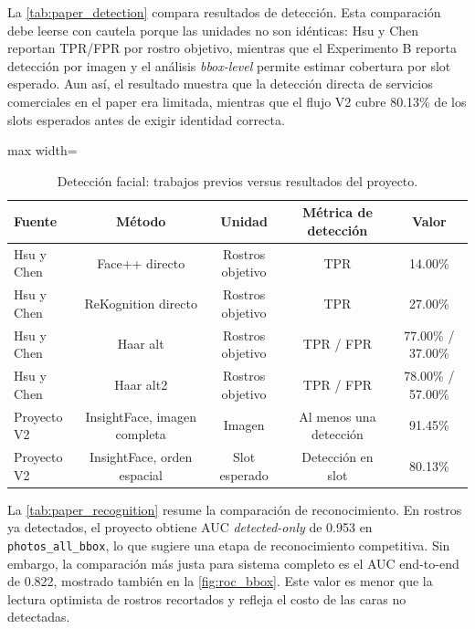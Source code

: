 \documentclass[11pt]{article}
\begin{document}
La \autoref{tab:paper_detection} compara resultados de detecci\'on. Esta comparaci\'on debe leerse con cautela porque las unidades no son id\'enticas: Hsu y Chen reportan TPR/FPR por rostro objetivo, mientras que el Experimento B reporta detecci\'on por imagen y el an\'alisis \textit{bbox-level} permite estimar cobertura por slot esperado. Aun as\'i, el resultado muestra que la detecci\'on directa de servicios comerciales en el paper era limitada, mientras que el flujo V2 cubre 80.13\% de los slots esperados antes de exigir identidad correcta.

\begin{table}[H]
\centering
\caption{Detecci\'on facial: trabajos previos versus resultados del proyecto.}
\label{tab:paper_detection}
\begin{adjustbox}{max width=\textwidth}
\begin{tabular}{lcccc}
\toprule
Fuente & M\'etodo & Unidad & M\'etrica de detecci\'on & Valor \\
\midrule
Hsu y Chen \cite{hsu2015issues} & Face++ directo & Rostros objetivo & TPR & 14.00\% \\
Hsu y Chen \cite{hsu2015issues} & ReKognition directo & Rostros objetivo & TPR & 27.00\% \\
Hsu y Chen \cite{hsu2015issues} & Haar alt & Rostros objetivo & TPR / FPR & 77.00\% / 37.00\% \\
Hsu y Chen \cite{hsu2015issues} & Haar alt2 & Rostros objetivo & TPR / FPR & 78.00\% / 57.00\% \\
Proyecto V2 & InsightFace, imagen completa & Imagen & Al menos una detecci\'on & 91.45\% \\
Proyecto V2 & InsightFace, orden espacial & Slot esperado & Detecci\'on en slot & 80.13\% \\
\bottomrule
\end{tabular}
\end{adjustbox}
\end{table}

La \autoref{tab:paper_recognition} resume la comparaci\'on de reconocimiento. En rostros ya detectados, el proyecto obtiene AUC \textit{detected-only} de 0.953 en \texttt{photos\_all\_bbox}, lo que sugiere una etapa de reconocimiento competitiva. Sin embargo, la comparaci\'on m\'as justa para sistema completo es el AUC end-to-end de 0.822, mostrado tambi\'en en la \autoref{fig:roc_bbox}. Este valor es menor que la lectura optimista de rostros recortados y refleja el costo de las caras no detectadas.
\end{document}
